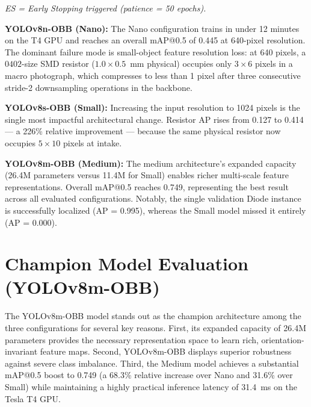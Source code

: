 \documentclass[12pt,a4paper]{report}
\begin{document}
\textit{ES = Early Stopping triggered (patience = 50 epochs).}

\textbf{YOLOv8n-OBB (Nano):} The Nano configuration trains in under 12 minutes on the T4 GPU and reaches an overall mAP@0.5 of 0.445 at 640-pixel resolution. The dominant failure mode is small-object feature resolution loss: at 640 pixels, a $0402$-size SMD resistor ($1.0 \times 0.5$~mm physical) occupies only $3 \times 6$ pixels in a macro photograph, which compresses to less than 1 pixel after three consecutive stride-2 downsampling operations in the backbone.

\textbf{YOLOv8s-OBB (Small):} Increasing the input resolution to 1024 pixels is the single most impactful architectural change. Resistor AP rises from 0.127 to 0.414 --- a 226\% relative improvement --- because the same physical resistor now occupies $5 \times 10$ pixels at intake.

\textbf{YOLOv8m-OBB (Medium):} The medium architecture's expanded capacity (26.4M parameters versus 11.4M for Small) enables richer multi-scale feature representations. Overall mAP@0.5 reaches 0.749, representing the best result across all evaluated configurations. Notably, the single validation Diode instance is successfully localized (AP = 0.995), whereas the Small model missed it entirely (AP = 0.000).

\section{Champion Model Evaluation (YOLOv8m-OBB)}
\label{sec:champion_model}

The YOLOv8m-OBB model stands out as the champion architecture among the three configurations for several key reasons. First, its expanded capacity of 26.4M parameters provides the necessary representation space to learn rich, orientation-invariant feature maps. Second, YOLOv8m-OBB displays superior robustness against severe class imbalance. Third, the Medium model achieves a substantial mAP@0.5 boost to 0.749 (a 68.3\% relative increase over Nano and 31.6\% over Small) while maintaining a highly practical inference latency of 31.4~ms on the Tesla T4 GPU.
\end{document}

